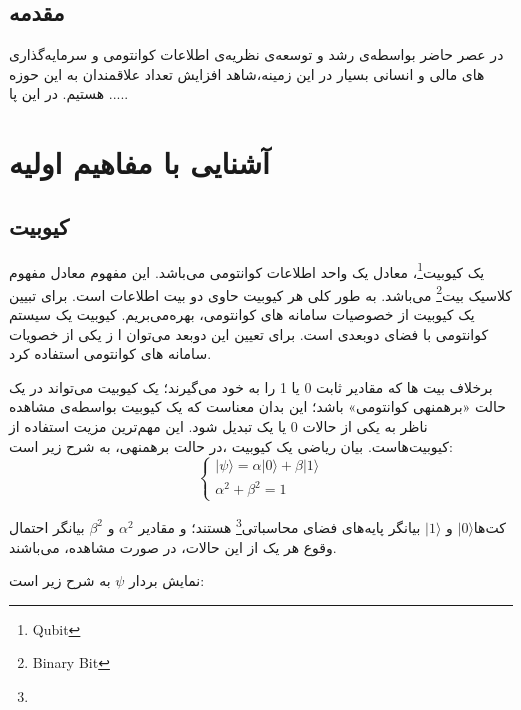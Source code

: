 \documentclass{book}
\begin{document}
	
\section{مقدمه}	
در عصر حاضر بواسطه‌ی رشد و توسعه‌ی نظریه‌ی اطلاعات کوانتومی و سرمایه‌گذاری های مالی و انسانی بسیار در این زمینه،‌شاهد افزایش تعداد علاقمندان به این حوزه هستیم. در این پا .....
\chapter{آشنایی با مفاهیم اولیه}
\section{کیوبیت}

یک کیوبیت\footnote{Qubit}، معادل یک واحد اطلاعات کوانتومی می‌باشد. این مفهوم معادل مفهوم کلاسیک بیت\footnote{Binary Bit} می‌باشد. به طور کلی هر کیوبیت حاوی دو بیت اطلاعات است. برای تبیین یک کیوبیت از خصوصیات سامانه های کوانتومی، بهره‌می‌بریم. کیوبیت یک سیستم کوانتومی با فضای دوبعدی است. برای تعیین این دوبعد می‌توان ا ز یکی از خصویات سامانه های کوانتومی استفاده کرد. 

برخلاف بیت ها که مقادیر ثابت 0 یا 1 را به خود می‌گیرند؛ یک کیوبیت می‌تواند در یک حالت «برهمنهی کوانتومی» باشد؛ این بدان معناست که یک کیوبیت بواسطه‌ی مشاهده ناظر به یکی از حالات 0 یا یک تبدیل شود. این مهم‌ترین مزیت استفاده از کیوبیت‌هاست. بیان ریاضی یک کیوبیت ،در حالت برهمنهی، به شرح زیر است:
\vspace{2cm}
$$
\left\{
\begin{array}{ll}
	  \vert \psi \rangle = \alpha\vert 0 \rangle + \beta\vert 1 \rangle \\
	  \alpha^2 + \beta^2 = 1
\end{array}
\right.
$$
\vspace{2cm}

\newpage
کت‌ها$\vert 0 \rangle$ و $\vert 1 \rangle$ بیانگر پایه‌های فضای 
محاسباتی\footnote{} هستند؛ و مقادیر $\alpha^2$ و $\beta^2$ بیانگر احتمال وقوع هر یک از این حالات، در صورت مشاهده، می‌باشند.

نمایش بردار $\psi$ به شرح زیر است:
\begin{center}
\end{center}
\end{document}
